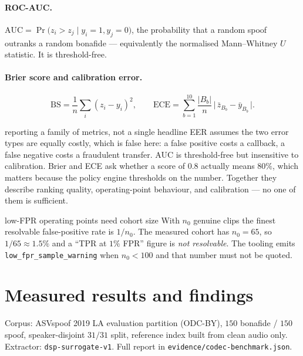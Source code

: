 \documentclass[11pt,a4paper]{article}
\newcommand{\code}[1]{\texttt{\small #1}}
\begin{document}
\paragraph{ROC-AUC.} $\mathrm{AUC} = \Pr\big(z_i > z_j \mid y_i = 1, y_j = 0\big)$,
the probability that a random spoof outranks a random bonafide --- equivalently the
normalised Mann--Whitney $U$ statistic. It is threshold-free.

\paragraph{Brier score and calibration error.}
\begin{equation}
\mathrm{BS} = \frac{1}{n}\sum_i (z_i - y_i)^2,
\qquad
\mathrm{ECE} = \sum_{b=1}^{10} \frac{|B_b|}{n}\,\big|\,\bar z_{B_b} - \bar y_{B_b}\,\big|.
\end{equation}

\begin{whybox}{reporting a family of metrics, not a single headline}
EER assumes the two error types are equally costly, which is false here: a false
positive costs a callback, a false negative costs a fraudulent transfer. AUC is
threshold-free but insensitive to calibration. Brier and ECE ask whether a score of
$0.8$ actually means $80\%$, which matters because the policy engine thresholds on the
number. Together they describe ranking quality, operating-point behaviour, and
calibration --- no one of them is sufficient.
\end{whybox}

\begin{warnbox}{low-FPR operating points need cohort size}
With $n_0$ genuine clips the finest resolvable false-positive rate is $1/n_0$. The
measured cohort has $n_0 = 65$, so $1/65 \approx 1.5\%$ and a ``TPR at $1\%$ FPR''
figure is \emph{not resolvable}. The tooling emits \code{low\_fpr\_sample\_warning} when
$n_0 < 100$ and that number must not be quoted.
\end{warnbox}

\section{Measured results and findings}
\label{sec:findings}

Corpus: ASVspoof 2019 LA evaluation partition (ODC-BY), $150$ bonafide / $150$ spoof,
speaker-disjoint $31/31$ split, reference index built from clean audio only. Extractor:
\code{dsp-surrogate-v1}. Full report in \code{evidence/codec-benchmark.json}.
\end{document}
